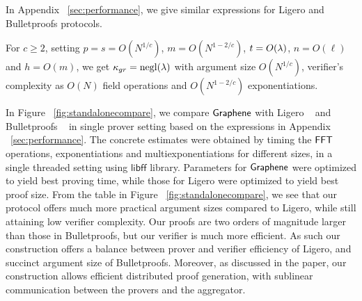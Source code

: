 In Appendix ~\ref{sec:performance}, we give similar expressions for Ligero and
Bulletproofs protocols. 


For $c\geq 2$, setting $p=s=O(N^{1/c})$, $m=O(N^{1-2/c})$, $t=O(\lambda)$,
$n=O(\ell)$ and $h=O(m)$, we get $\kappa_{gr}=\mathrm{negl}(\lambda)$ with argument size
$O(N^{1/c})$, verifier's complexity as $O(N)$ field operations and
$O(N^{1-2/c})$ exponentiations. 

In Figure ~\ref{fig:standalonecompare}, we compare
$\textsf{Graphene}$ with Ligero ~\cite{ligero} and Bulletproofs ~\cite{bulletproofs} in
single prover setting based on the expressions in Appendix
~\ref{sec:performance}. The concrete estimates were obtained by timing the $\mathsf{FFT}$
operations, exponentiations and multiexponentiations for different sizes, in a
single threaded setting using $\mathsf{libff}$ library. Parameters for $\textsf{Graphene}$ were optimized to yield best
proving time, while those for Ligero were optimized to yield best proof size.
From the table in Figure ~\ref{fig:standalonecompare}, we see that our protocol offers much more practical argument
sizes compared to Ligero, while still attaining low verifier complexity. Our
proofs are two orders of magnitude larger than those in Bulletproofs, but our
verifier is much more efficient. As such our construction offers a balance
between prover and verifier efficiency of Ligero, and succinct argument size of
Bulletproofs. Moreover, as discussed in the paper, our construction allows
efficient distributed proof generation, with sublinear communication between the
provers and the aggregator. 
